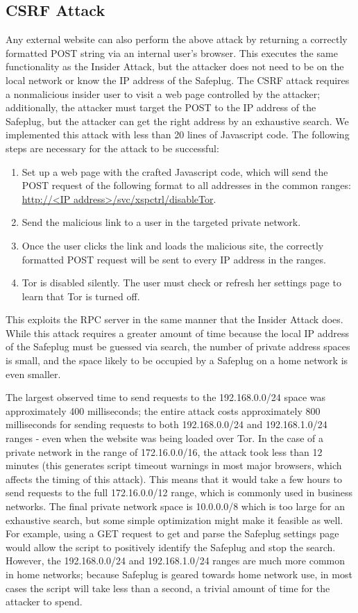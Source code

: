 \documentclass[conference]{IEEEtran}
\begin{document}
\subsection{CSRF Attack}
Any external website can also perform the above attack by returning a correctly formatted POST string via an internal user's browser.  This executes the same functionality as the Insider Attack, but the attacker does not need to be on the local network or know the IP address of the Safeplug.  The CSRF attack requires a nonmalicious insider user to visit a web page controlled by the attacker; additionally, the attacker must target the POST to the IP address of the Safeplug, but the attacker can get the right address by an exhaustive search.  We implemented this attack with less than 20 lines of Javascript code.  The following steps are necessary for the attack to be successful:

\begin{enumerate}
\item Set up a web page with the crafted Javascript code, which will send the POST request of the following format to all addresses in the common ranges: \url{http://<IP address>/svc/xspctrl/disableTor}.
\item Send the malicious link to a user in the targeted private network.
\item Once the user clicks the link and loads the malicious site, the correctly formatted POST request will be sent to every IP address in the ranges.  
\item Tor is disabled silently.  The user must check or refresh her settings page to learn that Tor is turned off.  
\end{enumerate}  

This exploits the RPC server in the same manner that the Insider Attack does.  While this attack requires a greater amount of time because the local IP address of the Safeplug must be guessed via search, the number of private address spaces is small, and the space likely to be occupied by a Safeplug on a home network is even smaller.  

The largest observed time to send requests to the 192.168.0.0/24 space was approximately 400 milliseconds; the entire attack costs approximately 800 milliseconds for sending requests to both 192.168.0.0/24 and 192.168.1.0/24 ranges - even when the website was being loaded over Tor.  In the case of a private network in the range of 172.16.0.0/16, the attack took less than 12 minutes (this generates script timeout warnings in most major browsers, which affects the timing of this attack).  This means that it would take a few hours to send requests to the full 172.16.0.0/12 range, which is commonly used in business networks.  The final private network space is 10.0.0.0/8 which is too large for an exhaustive search, but some simple optimization might make it feasible as well.  For example, using a GET request to get and parse the Safeplug settings page would allow the script to positively identify the Safeplug and stop the search.  However, the 192.168.0.0/24 and 192.168.1.0/24 ranges are much more common in home networks; because Safeplug is geared towards home network use, in most cases the script will take less than a second, a trivial amount of time for the attacker to spend.  
\end{document}
